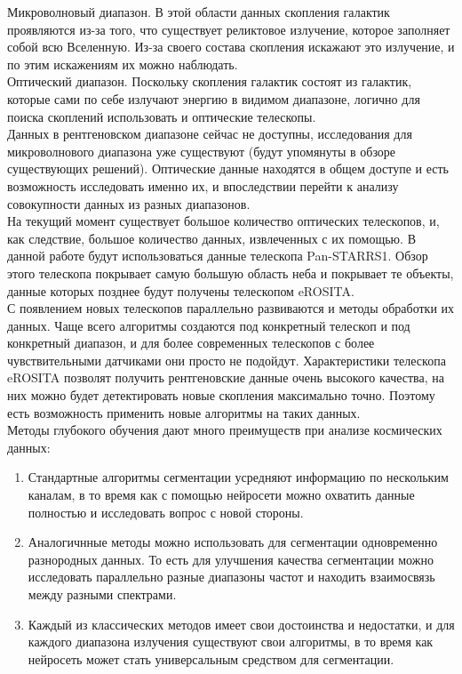 \documentclass{article}
\begin{document}
Микроволновый диапазон. В этой области данных 
скопления галактик проявляются из-за того, что существует реликтовое излучение, которое заполняет 
собой всю Вселенную. Из-за своего состава скопления искажают это излучение, и по этим искажениям 
их можно наблюдать.\\ 

Оптический диапазон. Поскольку скопления галактик состоят из галактик, которые сами по себе излучают энергию в видимом 
диапазоне, логично для поиска скоплений использовать и оптические телескопы.\\

Данных в рентгеновском диапазоне сейчас не доступны, исследования для микроволнового диапазона уже 
существуют (будут упомянуты в обзоре существующих решений). Оптические данные находятся в общем 
доступе и есть возможность исследовать именно их, и впоследствии перейти к анализу совокупности 
данных из разных диапазонов.\\


На текущий момент существует большое количество 
оптических телескопов, и, как следствие, большое количество данных, извлеченных с их помощью. В 
данной работе будут использоваться данные телескопа Pan-STARRS1. Обзор этого телескопа
покрывает самую большую область неба и покрывает те объекты, данные которых позднее будут получены 
телескопом eROSITA.\\

С появлением новых телескопов параллельно развиваются и 
методы обработки их данных. Чаще всего алгоритмы создаются под конкретный телескоп и под конкретный 
диапазон, и для более современных телескопов с более чувствительными датчиками они просто не подойдут.
Характеристики телескопа eROSITA позволят получить рентгеновские данные 
очень высокого качества, на них можно будет детектировать новые
скопления максимально точно. Поэтому есть возможность применить новые алгоритмы на таких данных.\\


Методы 
глубокого обучения дают много преимуществ при анализе космических данных: 

\begin{enumerate}
    \item Стандартные алгоритмы сегментации усредняют информацию по нескольким каналам,
        в то время как с помощью нейросети можно охватить данные полностью и исследовать вопрос с 
        новой стороны.
    \item Аналогичнные методы можно использовать для сегментации одновременно разнородных данных. 
        То есть для улучшения качества сегментации можно исследовать параллельно разные диапазоны 
        частот и находить взаимосвязь между разными спектрами.
    \item Каждый из классических методов имеет свои достоинства и недостатки, и для каждого 
        диапазона излучения существуют свои алгоритмы, в то время как 
        нейросеть может стать универсальным средством для сегментации.
\end{enumerate}
\end{document}
